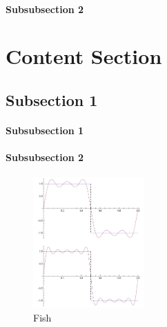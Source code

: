 \documentclass[12pt]{report} %
\begin{document}

\subsubsection{Subsubsection 2} %

\lipsum[4] %


\chapter{Content Section} %

\lipsum[5] %


\section{Subsection 1} %

\subsubsection{Subsubsection 1} %

\lipsum[6] %


\subsubsection{Subsubsection 2} %

\lipsum[6] %
\begin{figure} %
  \begin{center}
    \includegraphics[width=0.38\textwidth]{fourier}
  \end{center}
  \caption{Fish}
\end{figure}
\lipsum[7-8] %
\end{document}
